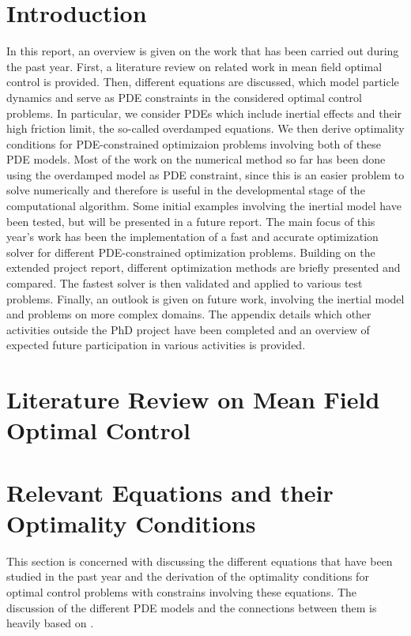 \documentclass[11pt, a4paper]{article}
\theoremstyle{definition}
\begin{document}
\section{Introduction}
In this report, an overview is given on the work that has been carried out during the past year. First, a literature review on related work in mean field optimal control is provided. Then, different equations are discussed, which model particle dynamics and serve as PDE constraints in the considered optimal control problems. In particular, we consider PDEs which include inertial effects and their high friction limit, the so-called overdamped equations. We then derive optimality conditions for PDE-constrained optimizaion problems involving both of these PDE models. Most of the work on the numerical method so far has been done using the overdamped model as PDE constraint, since this is an easier problem to solve numerically and therefore is useful in the developmental stage of the computational algorithm. Some initial examples involving the inertial model have been tested, but will be presented in a future report. 
The main focus of this year's work has been the implementation of a fast and accurate optimization solver for different PDE-constrained optimization problems. Building on the extended project report, different optimization methods are briefly presented and compared. The fastest solver is then validated and applied to various test problems.
Finally, an outlook is given on future work, involving the inertial model and problems on more complex domains. The appendix details which other activities outside the PhD project have been completed and an overview of expected future participation in various activities is provided.


\section{Literature Review on Mean Field Optimal Control}

\section{Relevant Equations and their Optimality Conditions}
This section is concerned with discussing the different equations that have been studied in the past year and the derivation of the optimality conditions for optimal control problems with constrains involving these equations. The discussion of the different PDE models and the connections between them is heavily based on \cite{Archer1}.
\end{document}
